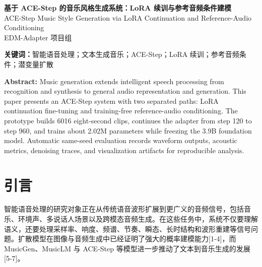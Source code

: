 \documentclass[UTF8,a4paper,zihao=-4,fontset=none]{ctexart}
\begin{document}
\pagestyle{plain}
\begin{center}
{\LARGE\bfseries 基于 ACE-Step 的音乐风格生成系统：LoRA 续训与参考音频条件建模}\\[0.5em]
{\large ACE-Step Music Style Generation via LoRA Continuation and Reference-Audio Conditioning}\\[0.8em]
EDM-Adapter 项目组
\end{center}
\begin{abstract}
音乐生成是智能语音处理从语音识别、语音合成扩展到通用音频理解与生成的重要任务，但通用文本到音乐模型仍难以稳定复现特定 EDM 制作风格。本文提出一个基于 ACE-Step 的双路径系统：一方面采用参数高效 LoRA 续训，在冻结 MusicDCAE、UMT5 与大部分扩散 Transformer 的前提下，将可训练范围由最后 2 个 block 扩展到最后 4 个 block；另一方面设计无训练参考音频条件链路，对上传音频进行标准化、声学特征提取和参考 latent 编码，实现音色与频谱质感迁移。实验使用 231 个原始音频源构建 6016 条 8 秒样本，训练/验证/测试划分为 4833/557/626；LoRA 从 step=120 续训 840 步至 step=960，可训练参数约 2.02M，仅占 3.9B 基础模型的约 0.05\%。同 seed 自动评估表明系统能够在固定随机起点下生成 baseline 与 LoRA 对照音频，并记录 RMS、低频比例、BPM、起音密度和 latent 去噪轨迹。结果说明，该系统在 4 卡 RTX 4090 工作站上实现了真实参数适配、无训练参考音频条件生成和可复现实验记录。
\end{abstract}
\noindent\textbf{关键词：}智能语音处理；文本生成音乐；ACE-Step；LoRA 续训；参考音频条件；潜变量扩散

\noindent\textbf{Abstract:} Music generation extends intelligent speech processing from recognition and synthesis to general audio representation and generation. This paper presents an ACE-Step system with two separated paths: LoRA continuation fine-tuning and training-free reference-audio conditioning. The prototype builds 6016 eight-second clips, continues the adapter from step 120 to step 960, and trains about 2.02M parameters while freezing the 3.9B foundation model. Automatic same-seed evaluation records waveform outputs, acoustic metrics, denoising traces, and visualization artifacts for reproducible analysis.

\section{引言}
智能语音处理的研究对象正在从传统语音波形扩展到更广义的音频信号，包括音乐、环境声、多说话人场景以及跨模态音频生成。在这些任务中，系统不仅要理解语义，还要处理采样率、响度、频谱、节奏、瞬态、长时结构和波形重建等信号问题。扩散模型在图像与音频生成中已经证明了强大的概率建模能力[1-4]，而 MusicGen、MusicLM 与 ACE-Step 等模型进一步推动了文本到音乐生成的发展[5-7]。
\end{document}
